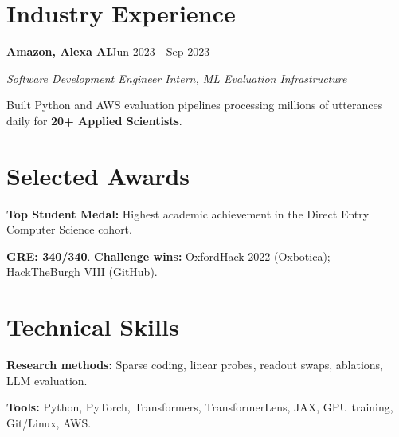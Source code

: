 \documentclass[letterpaper,11pt]{article}
\newcommand{\position}[4]{\par\addvspace{4pt}\textbf{#1}\hfill #2\par\textit{#3}\hfill\textit{#4}\par\nopagebreak}
\begin{document}
\section{Industry Experience}
\position{Amazon, Alexa AI}{Jun 2023 - Sep 2023}{Software Development Engineer Intern, ML Evaluation Infrastructure}{ }
Built Python and AWS evaluation pipelines processing millions of utterances daily for \textbf{20+ Applied Scientists}.

\section{Selected Awards}
\textbf{Top Student Medal:} Highest academic achievement in the Direct Entry Computer Science cohort.\par
\textbf{GRE: 340/340}. \textbf{Challenge wins:} OxfordHack 2022 (Oxbotica); HackTheBurgh VIII (GitHub).

\section{Technical Skills}
\textbf{Research methods:} Sparse coding, linear probes, readout swaps, ablations, LLM evaluation.\par
\textbf{Tools:} Python, PyTorch, Transformers, TransformerLens, JAX, GPU training, Git/Linux, AWS.\par
\end{document}
